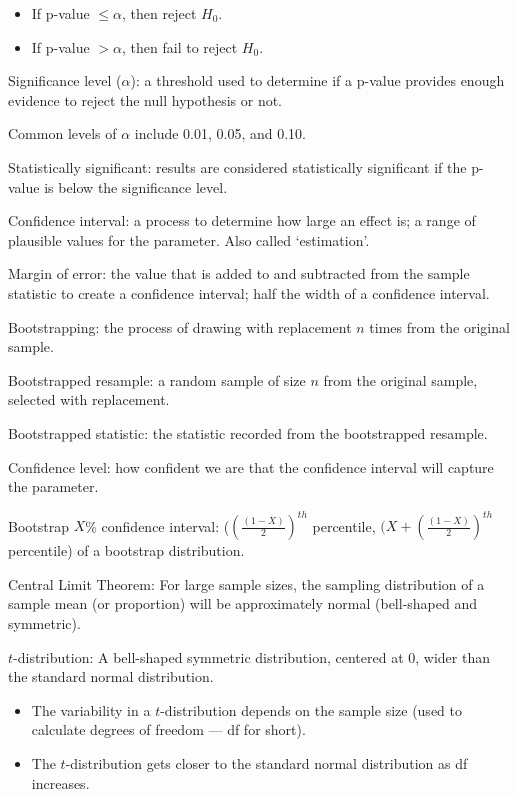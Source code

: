 \documentclass[
]{report}
\providecommand{\tightlist}{%
  \setlength{\itemsep}{0pt}\setlength{\parskip}{0pt}}
\newcommand{\rgi}{\hspace{24pt}}  %
\begin{document}
\begin{itemize}
\item
  If p-value \(\leq \alpha\), then reject \(H_0\).
\item
  If p-value \(> \alpha\), then fail to reject \(H_0\).
\end{itemize}

Significance level (\(\alpha\)): a threshold used to determine if a p-value provides enough evidence to reject the null hypothesis or not.

\rgi Common levels of \(\alpha\) include 0.01, 0.05, and 0.10.

Statistically significant: results are considered statistically significant if the p-value is below the significance level.

Confidence interval: a process to determine how large an effect is; a range of plausible values for the parameter. Also called `estimation'.

Margin of error: the value that is added to and subtracted from the sample statistic to create a confidence interval; half the width of a confidence interval.

Bootstrapping: the process of drawing with replacement \(n\) times from the original sample.

Bootstrapped resample: a random sample of size \(n\) from the original sample, selected with replacement.

Bootstrapped statistic: the statistic recorded from the bootstrapped resample.

Confidence level: how confident we are that the confidence interval will capture the parameter.

Bootstrap \(X\)\% confidence interval: (\((\frac{(1-X)}{2})^{th}\) percentile, \((X+(\frac{(1-X)}{2})^{th}\) percentile) of a bootstrap distribution.

Central Limit Theorem: For large sample sizes, the sampling distribution of a sample mean (or proportion) will be approximately normal (bell-shaped and symmetric).

\(t\)-distribution: A bell-shaped symmetric distribution, centered at 0, wider than the standard normal distribution.

\begin{itemize}
\tightlist
\item
  The variability in a \(t\)-distribution depends on the sample size (used to calculate degrees of freedom --- df for short).
\item
  The \(t\)-distribution gets closer to the standard normal distribution as df increases.
\end{itemize}
\end{document}
